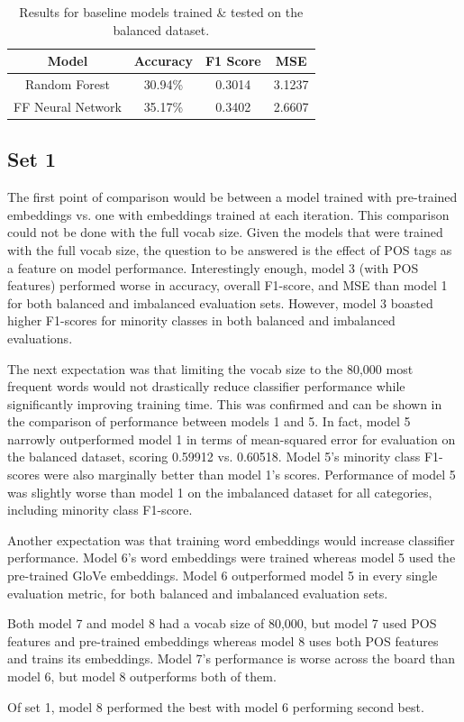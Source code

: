 \begin{table}[H]
	\begin{tabular}{|c|c|c|c|}
		\hline
		\textbf{Model}    & \textbf{Accuracy} & \textbf{F1 Score} & \textbf{MSE} \\ \hline
		Random Forest     & 30.94\%           & 0.3014            & 3.1237       \\
		FF Neural Network & 35.17\%           & 0.3402            & 2.6607    \\ \hline
	\end{tabular}
	\caption{\label{tab:baselines_balanced} Results for baseline models trained \& tested on the balanced dataset.}
\end{table}


\subsection{Set 1}
The first point of comparison would be between a model trained with pre-trained embeddings vs. one with embeddings trained at each iteration. This comparison could not be done with the full vocab size. Given the models that were trained with the full vocab size, the question to be answered is the effect of POS tags as a feature on model performance. Interestingly enough, model 3 (with POS features) performed worse in accuracy, overall F1-score, and MSE than model 1 for both balanced and imbalanced evaluation sets. However, model 3 boasted higher F1-scores for minority classes in both balanced and imbalanced evaluations.
\par 
The next expectation was that limiting the vocab size to the 80,000 most frequent words would not drastically reduce classifier performance while significantly improving training time. This was confirmed and can be shown in the comparison of performance between models 1 and 5. In fact, model 5 narrowly outperformed model 1 in terms of mean-squared error for evaluation on the balanced dataset, scoring 0.59912 vs. 0.60518. Model 5's minority class F1-scores were also marginally better than model 1's scores.  Performance of model 5 was slightly worse than model 1 on the imbalanced dataset for all categories, including minority class F1-score.
\par 
Another expectation was that training word embeddings would increase classifier performance. Model 6's word embeddings were trained whereas model 5 used the pre-trained GloVe embeddings. Model 6 outperformed model 5 in every single evaluation metric, for both balanced and imbalanced evaluation sets.
\par 
Both model 7 and model 8 had a vocab size of 80,000, but model 7 used POS features and pre-trained embeddings whereas model 8 uses both POS features and trains its embeddings. Model 7's performance is worse across the board than model 6, but model 8 outperforms both of them.
\par 
Of set 1, model 8 performed the best with model 6 performing second best. 

